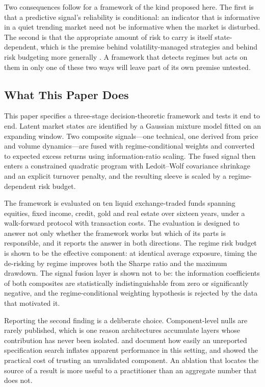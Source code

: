 \documentclass{singlecol-new}
\theoremstyle{TH}{
\newtheorem{lemma}{Lemma}
\newtheorem{theorem}[lemma]{Theorem}
\newtheorem{corrolary}[lemma]{Corrolary}
\newtheorem{conjecture}[lemma]{Conjecture}
\newtheorem{proposition}[lemma]{Proposition}
\newtheorem{claim}[lemma]{Claim}
\newtheorem{stheorem}[lemma]{Wrong Theorem}
\newtheorem{algorithm}{Algorithm}
}
\theoremstyle{THrm}{
\newtheorem{definition}{Definition}[section]
\newtheorem{question}{Question}[section]
\newtheorem{remark}{Remark}
\newtheorem{scheme}{Scheme}
}
\theoremstyle{THhit}{
\newtheorem{case}{Case}[section]
}
\begin{document}
Two consequences follow for a framework of the kind proposed here. The first is that a
predictive signal's reliability is conditional: an indicator that is informative in a
quiet trending market need not be informative when the market is disturbed. The second
is that the appropriate amount of risk to carry is itself state-dependent, which is the
premise behind volatility-managed strategies \citep{moreira17, hood25} and behind risk
budgeting more generally \citep{asimit25}. A framework that detects regimes but acts on
them in only one of these two ways will leave part of its own premise untested.

\subsection{What This Paper Does}

This paper specifies a three-stage decision-theoretic framework and tests it end to
end. Latent market states are identified by a Gaussian mixture model fitted on an
expanding window. Two composite signals---one technical, one derived from price and
volume dynamics---are fused with regime-conditional weights and converted to expected
excess returns using information-ratio scaling. The fused signal then enters a
constrained quadratic program with Ledoit--Wolf covariance shrinkage
\citep{ledoit04} and an explicit turnover penalty, and the resulting sleeve is scaled by
a regime-dependent risk budget.

The framework is evaluated on ten liquid exchange-traded funds spanning equities, fixed
income, credit, gold and real estate over sixteen years, under a walk-forward protocol
with transaction costs. The evaluation is designed to answer not only whether the
framework works but which of its parts is responsible, and it reports the answer in
both directions. The regime risk budget is shown to be the effective component: at
identical average exposure, timing the de-risking by regime improves both the Sharpe
ratio and the maximum drawdown. The signal fusion layer is shown not to be: the
information coefficients of both composites are statistically indistinguishable from
zero or significantly negative, and the regime-conditional weighting hypothesis is
rejected by the data that motivated it.

Reporting the second finding is a deliberate choice. Component-level nulls are rarely
published, which is one reason architectures accumulate layers whose contribution has
never been isolated. \citet{harvey15} and \citet{valls26} document how easily an
unreported specification search inflates apparent performance in this setting, and
\citet{demiguel09} showed the practical cost of trusting an unvalidated component. An
ablation that locates the source of a result is more useful to a practitioner than an
aggregate number that does not.
\end{document}
